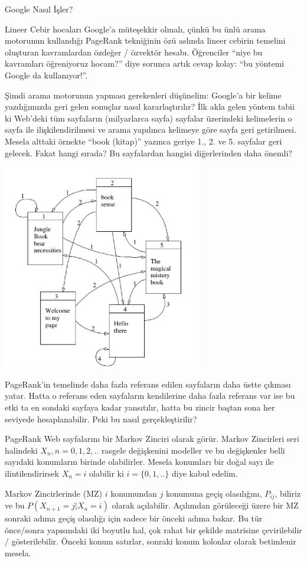 \documentclass[12pt,fleqn]{article}\usepackage{../../common}
\begin{document}
Google Nasıl İşler? 

Lineer Cebir hocaları Google'a müteşekkir olmalı, çünkü bu ünlü arama
motorunun kullandığı PageRank tekniğinin özü aslında lineer cebirin
temelini oluşturan kavramlardan özdeğer / özvektör hesabı. Öğrenciler
``niye bu kavramları öğreniyoruz hocam?''  diye sorunca artık cevap
kolay: ``bu yöntemi Google da kullanıyor!''.

Şimdi arama motorunun yapması gerekenleri düşünelim: Google'a bir kelime
yazdığımızda geri gelen sonuçlar nasıl kararlaştırılır? İlk akla gelen
yöntem tabii ki Web'deki tüm sayfaların (milyarlarca sayfa) sayfalar
üzerindeki kelimelerin o sayfa ile ilişkilendirilmesi ve arama yapılınca
kelimeye göre sayfa geri getirilmesi. Mesela alttaki örnekte ``book
(kitap)'' yazınca geriye 1., 2. ve 5. sayfalar geri gelecek. Fakat hangi
sırada? Bu sayfalardan hangisi diğerlerinden daha önemli?

\includegraphics[height=9cm]{pg2.png}

PageRank'in temelinde daha fazla referans edilen sayfaların daha üstte
çıkması yatar. Hatta o referans eden sayfaların kendilerine daha fazla
referans var ise bu etki ta en sondaki sayfaya kadar yansıtılır, hatta bu
zincir baştan sona her seviyede hesaplanabilir. Peki bu nasıl
gerçekleştirilir?

PageRank Web sayfalarını bir Markov Zinciri olarak görür. Markov Zincirleri
seri halindeki $X_n, n=0,1,2,..$ rasgele değişkenini modeller ve bu
değişkenler belli sayıdaki konumların birinde olabilirler. Mesela konumları
bir doğal sayı ile ilintilendirirsek $X_n = i$ olabilir ki $i=\{0,1,..\}$
diye kabul edelim.

Markov Zincirlerinde (MZ) $i$ konumundan $j$ konumuna geçiş olasılığını,
$P_{ij}$, biliriz ve bu $P(X_{n+1} = j | X_{n} = i)$ olarak açılabilir. Açılımdan  
görüleceği üzere bir MZ sonraki adıma geçiş olasılığı için sadece
bir önceki adıma bakar. Bu tür önce/sonra yapısındaki iki boyutlu hal, 
çok rahat bir şekilde matrisine çevirilebilir / gösterilebilir. Önceki konum 
satırlar, sonraki konum kolonlar olarak betimlenir mesela. 
\end{document}
